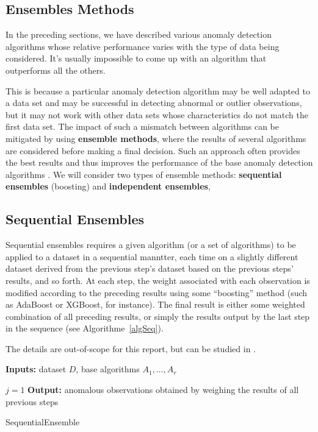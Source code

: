 \subsection{Ensembles Methods}
%
%
In the preceding sections, we have described various anomaly detection algorithms whose relative performance varies with the type of data being considered. It's usually impossible to come up with an algorithm that outperforms all the others. \par This is because a particular anomaly detection algorithm may be well adapted to a data set and may be successful in detecting abnormal or outlier observations, but it may not work with other data sets whose characteristics do not match the first data set. \newl The impact of such a mismatch between algorithms can be mitigated by using  \textbf{ensemble methods}, where the results of several algorithms are considered before making a final decision. Such an approach often provides the best results and thus improves the performance of the base anomaly detection algorithms \cite{A10}. 
\newl We will consider two types of ensemble methods:  \textbf{sequential ensembles} (boosting) and \textbf{independent ensembles}, 
\subsection*{Sequential Ensembles}
Sequential ensembles requires a given algorithm (or a set of algorithms) to be applied to a dataset in a sequential manntter, each time on a slightly different dataset derived from the previous step's dataset based on the previous steps' results, and so forth. At each step, the weight associated with each observation is modified according to the preceding results using some ``boosting'' method (such as AdaBoost or XGBoost, for instance). \newl The final result is either some weighted combination of all preceding results, or simply the results output by the last step in the sequence (see Algorithme~\ref{algSeq}). 

The details are out-of-scope for this report, but can be studied in \cite{LB}.

\begin{algorithm}
\SetAlgoLined
\textbf{Inputs:} dataset $D$, base algorithms $A_1,\ldots,A_r$ 

$j=1$\;
\textbf{Output:} anomalous observations obtained by weighing the results of all previous steps 
\caption{SequentialEnsemble}\label{algSeq}
\end{algorithm}%
